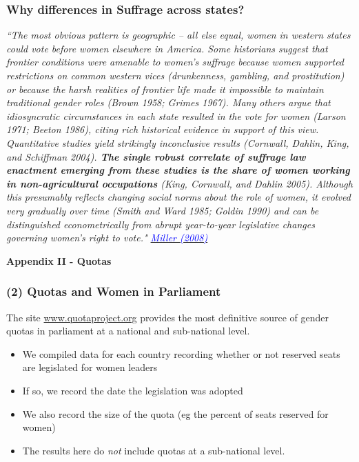 \documentclass[9pt,letterpaper,subeqn]{beamer}
\begin{document}
\begin{frame}[label=WhySuffrage]
\frametitle{Why differences in Suffrage across states?}
\vspace{4mm}
\textit{``The most obvious pattern is geographic – all else equal, women in western states could vote before women elsewhere in America. Some historians suggest that frontier conditions were amenable to women's suffrage because women supported restrictions on common western vices (drunkenness, gambling, and prostitution) or because the harsh realities of frontier life made it impossible to maintain traditional gender roles (Brown 1958; Grimes 1967). Many others argue that idiosyncratic circumstances in each state resulted in the vote for women (Larson 1971; Beeton 1986), citing rich historical evidence in support of this view. Quantitative studies yield strikingly inconclusive results (Cornwall, Dahlin, King, and Schiffman 2004). \textbf{The single robust correlate of suffrage law enactment emerging from these studies is the share of women working in non-agricultural occupations} (King, Cornwall, and Dahlin 2005). Although this presumably reflects changing social norms about the role of women, it evolved very gradually over time (Smith and Ward 1985; Goldin 1990) and can be distinguished econometrically from abrupt year-to-year legislative changes governing women’s right to vote." \hyperlink{USAHistory}{\textcolor{blue}{Miller (2008)}}}\\
 \end{frame} 


\begin{frame}[plain]
\begin{center}
\textbf{Appendix II - Quotas}
\end{center}
\end{frame}
\begin{frame}
\frametitle{(2) Quotas and Women in Parliament}
The site \url{www.quotaproject.org} provides the most definitive source of
gender quotas in parliament at a national and sub-national level. \vspace{5mm}
\begin{itemize}
\setlength{\itemsep}{10pt}
\item We compiled data for each country recording whether or
  not reserved seats are legislated for women leaders
\item If so, we record the date the legislation was adopted
\item We also record the size of the quota (eg the percent of seats reserved for
  women)
\item The results here do \emph{not} include quotas at a sub-national level.
\end{itemize}
\end{frame}
\end{document}
